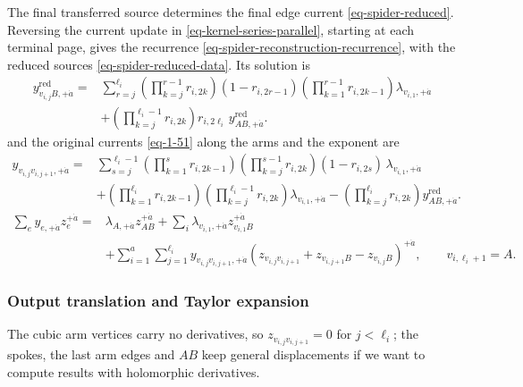 \documentclass[11pt]{article}
\numberwithin{equation}{section}
\numberwithin{figure}{section}
\numberwithin{table}{section}
\begin{document}
The final transferred source determines the final edge current \eqref{eq-spider-reduced}. Reversing the current update in \eqref{eq-kernel-series-parallel}, starting at each terminal page, gives the recurrence \eqref{eq-spider-reconstruction-recurrence}, with the reduced sources \eqref{eq-spider-reduced-data}. Its solution is
\begin{equation}\label{eq-1-50}
\begin{aligned}
y^{\mathrm{red}}_{v_{i,j}B,+\dot a}
={}&\sum_{r=j}^{\ell_i}
\left(\prod_{k=j}^{r-1}r_{i,2k}\right)(1-r_{i,2r-1})
\left(\prod_{k=1}^{r-1}r_{i,2k-1}\right)\lambda_{v_{i,1},+\dot a}\\
&+\left(\prod_{k=j}^{\ell_i-1}r_{i,2k}\right)r_{i,2\ell_i}\,
y^{\mathrm{red}}_{AB,+\dot a}.
\end{aligned}
\end{equation}
and the original currents \eqref{eq-1-51} along the arms and the exponent are
\begin{equation}\label{eq-spider-arm-current}
\begin{aligned}
y_{v_{i,j}v_{i,j+1},+\dot a}
={}&\sum_{s=j}^{\ell_i-1}
\left(\prod_{k=1}^{s}r_{i,2k-1}\right)
\left(\prod_{k=j}^{s-1}r_{i,2k}\right)(1-r_{i,2s})\,
\lambda_{v_{i,1},+\dot a}\\
&+\left(\prod_{k=1}^{\ell_i}r_{i,2k-1}\right)
\left(\prod_{k=j}^{\ell_i-1}r_{i,2k}\right)
\lambda_{v_{i,1},+\dot a}
-\left(\prod_{k=j}^{\ell_i}r_{i,2k}\right)
y^{\mathrm{red}}_{AB,+\dot a}.
\end{aligned}
\end{equation}
\begin{equation}\label{eq-spider-loop-split}
\begin{aligned}
\sum_e y_{e,+\dot a}z_e^{+\dot a}
={}&\lambda_{A,+\dot a}z_{AB}^{+\dot a}
+\sum_i\lambda_{v_{i,1},+\dot a}z_{v_{i,1}B}^{+\dot a}\\
&+\sum_{i=1}^a\sum_{j=1}^{\ell_i}
y_{v_{i,j}v_{i,j+1},+\dot a}
(z_{v_{i,j}v_{i,j+1}}+z_{v_{i,j+1}B}-z_{v_{i,j}B})^{+\dot a},
\qquad v_{i,\ell_i+1}=A.
\end{aligned}
\end{equation}

\subsubsection{Output translation and Taylor expansion}

The cubic arm vertices carry no derivatives, so $z_{v_{i,j}v_{i,j+1}}=0$ for $j<\ell_i$; the spokes, the last arm edges and $AB$ keep general displacements if we want to compute results with holomorphic derivatives.
\end{document}
